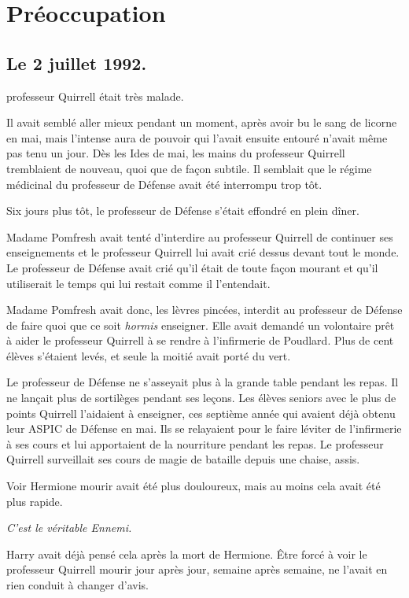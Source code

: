 \chapter{Préoccupation}

\section{Le 2 juillet 1992.}

 professeur Quirrell était très malade.

\hplettrineextrapara
Il avait semblé aller mieux pendant un moment, après avoir bu le sang de licorne en mai, mais l'intense aura de pouvoir qui l'avait ensuite entouré n'avait même pas tenu un jour.
Dès les Ides de mai, les mains du professeur Quirrell tremblaient de nouveau, quoi que de façon subtile.
Il semblait que le régime médicinal du professeur de Défense avait été interrompu trop tôt.

Six jours plus tôt, le professeur de Défense s'était effondré en plein dîner.

Madame Pomfresh avait tenté d'interdire au professeur Quirrell de continuer ses enseignements et le professeur Quirrell lui avait crié dessus devant tout le monde.
Le professeur de Défense avait crié qu'il était de toute façon mourant et qu'il utiliserait le temps qui lui restait comme il l'entendait.

Madame Pomfresh avait donc, les lèvres pincées, interdit au professeur de Défense de faire quoi que ce soit \emph{hormis} enseigner.
Elle avait demandé un volontaire prêt à aider le professeur Quirrell à se rendre à l'infirmerie de Poudlard.
Plus de cent élèves s'étaient levés, et seule la moitié avait porté du vert.

Le professeur de Défense ne s'asseyait plus à la grande table pendant les repas.
Il ne lançait plus de sortilèges pendant ses leçons.
Les élèves seniors avec le plus de points Quirrell l'aidaient à enseigner, ces septième année qui avaient déjà obtenu leur ASPIC de Défense en mai.
Ils se relayaient pour le faire léviter de l'infirmerie à ses cours et lui apportaient de la nourriture pendant les repas.
Le professeur Quirrell surveillait ses cours de magie de bataille depuis une chaise, assis.

Voir Hermione mourir avait été plus douloureux, mais au moins cela avait été plus rapide.

\emph{C'est le véritable Ennemi.}

Harry avait déjà pensé cela après la mort de Hermione.
Être forcé à voir le professeur Quirrell mourir jour après jour, semaine après semaine, ne l'avait en rien conduit à changer d'avis.

